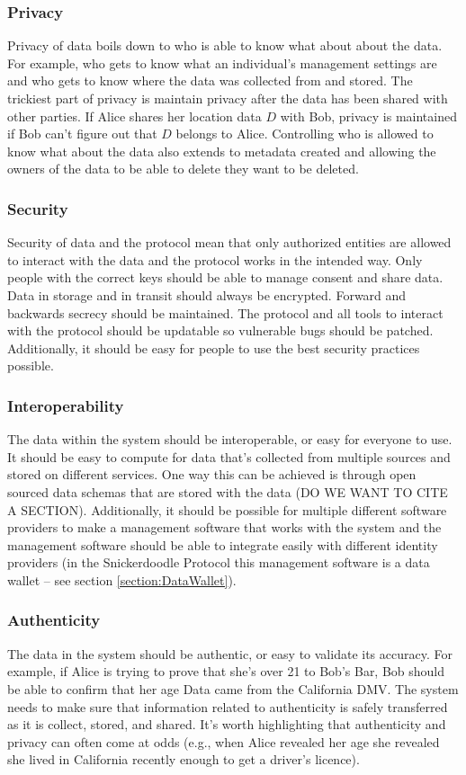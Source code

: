 \subsubsection{Privacy}
Privacy of data boils down to who is able to know what about about the data. For example, who gets to know what an individual's management settings are and who gets to know where the data was collected from and stored. The trickiest part of privacy is maintain privacy after the data has been shared with other parties. If Alice shares her location data $D$ with Bob, privacy is maintained if Bob can't figure out that $D$ belongs to Alice. Controlling who is allowed to know what about the data also extends to metadata created and allowing the owners of the data to be able to delete they want to be deleted. 

\subsubsection{Security}
Security of data and the protocol mean that only authorized entities are allowed to interact with the data and the protocol works in the intended way. Only people with the correct keys should be able to manage consent and share data. Data in storage and in transit should always be encrypted. Forward and backwards secrecy should be maintained. The protocol and all tools to interact with the protocol should be updatable so vulnerable bugs should be patched. Additionally, it should be easy for people to use the best security practices possible.

\subsubsection{Interoperability}
The data within the system should be interoperable, or easy for everyone to use. It should be easy to compute for data that's collected from multiple sources and stored on different services. One way this can be achieved is through open sourced data schemas that are stored with the data (DO WE WANT TO CITE A SECTION). Additionally, it should be possible for multiple different software providers to make a management software that works with the system and the management software should be able to integrate easily with different identity providers (in the Snickerdoodle Protocol this management software is a data wallet -- see section \ref{section:DataWallet}).

\subsubsection{Authenticity}
The data in the system should be authentic, or easy to validate its accuracy. For example, if Alice is trying to prove that she's over 21 to Bob's Bar, Bob should be able to confirm that her age Data came from the California DMV. The system needs to make sure that information related to authenticity is safely transferred as it is collect, stored, and shared. It's worth highlighting that authenticity and privacy can often come at odds (e.g., when Alice revealed her age she revealed she lived in California recently enough to get a driver's licence). 


